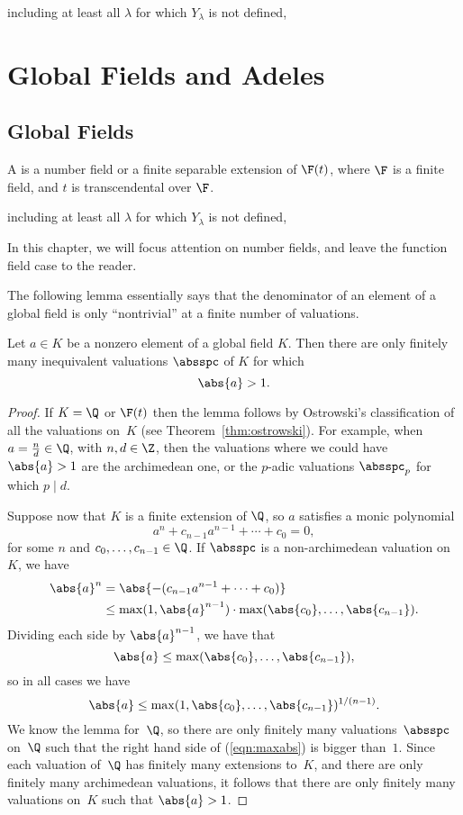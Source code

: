 including at least all $\lambda$ for which $Y_\lambda$ is not defined, \chapter{Global Fields and Adeles}
\section{Global Fields}\label{sec:global_fields}
\begin{definition}
  A  is a number field or a finite separable
  extension of $\F(t)$, where $\F$ is a finite field, and $t$ is
  transcendental over $\F$.
\end{definition}including at least all $\lambda$ for which $Y_\lambda$ is not defined, 

In this chapter, we will focus attention on number fields, and leave
the function field case to the reader.

The following lemma essentially says that the denominator of an
element of a global field is only ``nontrivial'' at a finite number of
valuations.
\begin{lemma}\label{lem:absbig}
Let $a\in K$ be a nonzero element of a global field $K$.  Then
there are only finitely many inequivalent valuations $\absspc$
of $K$ for which 
$$
  \abs{a} > 1.
$$
\end{lemma}
\begin{proof}
  If $K=\Q$ or $\F(t)$ then the lemma follows by Ostrowski's
  classification of all the valuations on~$K$ (see 
Theorem~\ref{thm:ostrowski}). For example,
  when $a=\frac{n}{d}\in\Q$, with $n,d\in \Z$, then the valuations
  where we could have $\abs{a}>1$ are the archimedean one, or the
  $p$-adic valuations $\absspc_p$ for which $p\mid d$.

Suppose now that $K$ is a finite extension of $\Q$, so
$a$ satisfies a monic polynomial
$$
  a^n + c_{n-1} a^{n-1} + \cdots + c_0 = 0,
$$
for some $n$ and $c_0,\ldots, c_{n-1}\in\Q$.
If $\absspc$ is a non-archimedean valuation on $K$, we have
\begin{align*}
  \abs{a}^n &= \abs{-(c_{n-1} a^{n-1} + \cdots + c_0)} \\
      &\leq \max(1,\abs{a}^{n-1})\cdot \max(\abs{c_0},\ldots,\abs{c_{n-1}}).
\end{align*}
Dividing each side by $\abs{a}^{n-1}$, we have
that
$$
   \abs{a} \leq \max(\abs{c_0},\ldots,\abs{c_{n-1}}),
$$
so in all cases we have
\begin{equation}\label{eqn:maxabs}
   \abs{a} \leq \max(1, \abs{c_0},
   \ldots,\abs{c_{n-1}})^{1/(n-1)}.
\end{equation}
We know the lemma for~$\Q$, so there are only finitely many
valuations~$\absspc$ on~$\Q$ such that the right hand side of
(\ref{eqn:maxabs}) is bigger than~$1$.  Since each valuation of~$\Q$
has finitely many extensions to~$K$, and there are only finitely many
archimedean valuations, it follows that there are only finitely many
valuations on~$K$ such that $\abs{a}>1$.
\end{proof}

